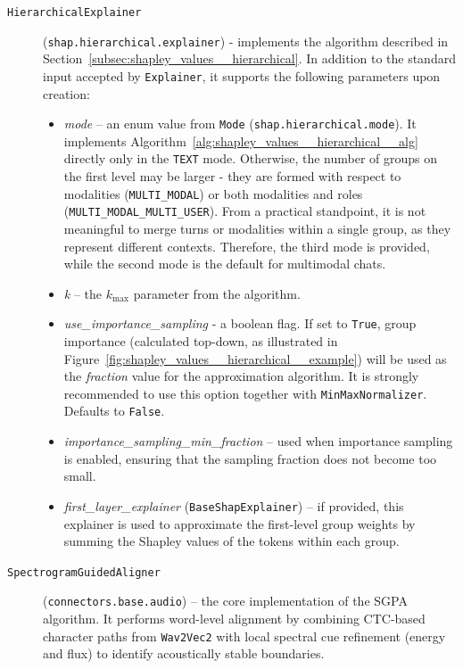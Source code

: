 \begin{appendices}
\begin{description}
    \item[\texttt{HierarchicalExplainer}] (\texttt{shap.hierarchical.explainer}) - implements the algorithm described in Section~\ref{subsec:shapley_values__hierarchical}. In addition to the standard input accepted by \texttt{Explainer}, it supports the following parameters upon creation:
        \begin{itemize}
            \item \textit{mode} -- an enum value from \texttt{Mode} (\texttt{shap.hierarchical.mode}). It implements Algorithm~\ref{alg:shapley_values__hierarchical__alg} directly only in the \texttt{TEXT} mode. Otherwise, the number of groups on the first level may be larger - they are formed with respect to modalities (\texttt{MULTI\_MODAL}) or both modalities and roles (\texttt{MULTI\_MODAL\_MULTI\_USER}). From a practical standpoint, it is not meaningful to merge turns or modalities within a single group, as they represent different contexts. Therefore, the third mode is provided, while the second mode is the default for multimodal chats.
            \item \textit{k} -- the $k_{\text{max}}$ parameter from the algorithm.
            \item \textit{use\_importance\_sampling} - a boolean flag. If set to \texttt{True}, group importance (calculated top-down, as illustrated in Figure~\ref{fig:shapley_values__hierarchical__example}) will be used as the \textit{fraction} value for the approximation algorithm. It is strongly recommended to use this option together with \texttt{MinMaxNormalizer}. Defaults to \texttt{False}.
            \item \textit{importance\_sampling\_min\_fraction} -- used when importance sampling is enabled, ensuring that the sampling fraction does not become too small.
            \item \textit{first\_layer\_explainer} (\texttt{BaseShapExplainer}) -- if provided, this explainer is used to approximate the first-level group weights by summing the Shapley values of the tokens within each group.
        \end{itemize}

    \item[\texttt{SpectrogramGuidedAligner}] (\texttt{connectors.base.audio}) -- the core implementation of the SGPA algorithm. It performs word-level alignment by combining CTC-based character paths from \texttt{Wav2Vec2} with local spectral cue refinement (energy and flux) to identify acoustically stable boundaries.


\end{description}
\end{appendices}
